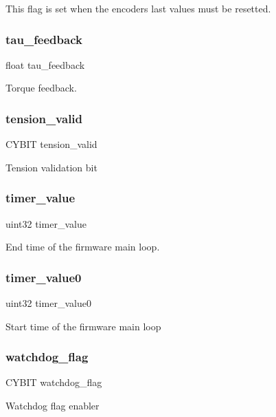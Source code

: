 This flag is set when the encoders last values must be resetted. \mbox{\label{globals_8h_a894b799ffe45f442a6a897580ab7e98e}} 
\subsubsection{tau\+\_\+feedback}
{\footnotesize\ttfamily float tau\+\_\+feedback}

Torque feedback. \mbox{\label{globals_8h_ac42fa606610c2600210d9b7b2c1d0882}} 
\subsubsection{tension\+\_\+valid}
{\footnotesize\ttfamily C\+Y\+B\+IT tension\+\_\+valid}

Tension validation bit \mbox{\label{globals_8h_ad47cd0e4d0fcf5739a88e52e949a8084}} 
\subsubsection{timer\+\_\+value}
{\footnotesize\ttfamily uint32 timer\+\_\+value}

End time of the firmware main loop. \mbox{\label{globals_8h_a9bab7f1b1cf2ba38d5968eee42644c32}} 
\subsubsection{timer\+\_\+value0}
{\footnotesize\ttfamily uint32 timer\+\_\+value0}

Start time of the firmware main loop \mbox{\label{globals_8h_a156a860c465529ff2f515725ab816a58}} 
\subsubsection{watchdog\+\_\+flag}
{\footnotesize\ttfamily C\+Y\+B\+IT watchdog\+\_\+flag}

Watchdog flag enabler 